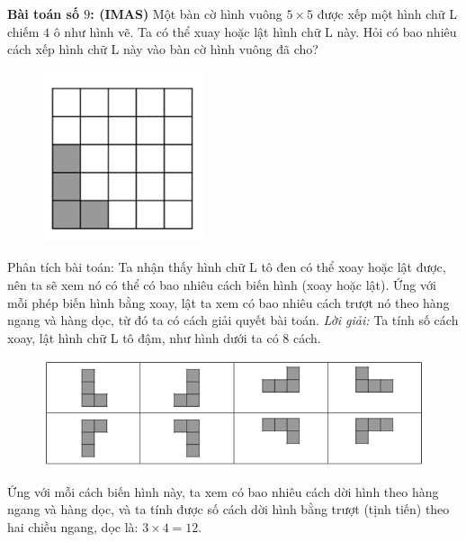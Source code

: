 \begin{multicols}{2}
	\vskip 0.1cm
	\textbf{\color{toancuabi}Bài toán số $9$: (IMAS)}
	\vskip 0.1cm
		Một bàn cờ hình vuông $5\times 5$ được xếp một hình chữ L chiếm $4$ ô như hình vẽ. Ta có thể xuay hoặc lật hình chữ L này. Hỏi có bao nhiêu cách xếp hình chữ L này vào bàn cờ hình vuông đã cho?
		\begin{figure}[H]
			\centering
			\vspace*{-10pt}
			\captionsetup{labelformat=empty, justification=centering}
			\includegraphics[width=0.4\linewidth]{_13}
			\vspace*{-15pt}
		\end{figure}
	Phân tích bài toán: Ta nhận thấy hình chữ L tô đen có thể xoay hoặc lật được, nên ta sẽ xem nó có thể có bao nhiêu cách biến hình (xoay hoặc lật).  Ứng với mỗi phép biến hình bằng xoay, lật ta xem có bao nhiêu cách trượt nó theo hàng ngang và hàng dọc, từ đó ta có cách giải quyết bài toán.
	\vskip 0.1cm
	\textit{Lời giải:}
	\vskip 0.1cm
	Ta tính số cách xoay, lật hình chữ L tô đậm, như hình dưới ta có $8$ cách.
	\begin{figure}[H]
		\centering
		\vspace*{-10pt}
		\captionsetup{labelformat=empty, justification=centering}
		\includegraphics[width=1\linewidth]{_14}
		\vspace*{-15pt}
	\end{figure}
	Ứng với mỗi cách biến hình này, ta xem có bao nhiêu cách dời hình theo hàng ngang và hàng dọc, và ta tính được số cách dời hình bằng trượt (tịnh tiến) theo hai chiều ngang, dọc là: $3\times4=12$.
	\vskip 0.1cm
		\begin{figure}[H]

\end{figure}
\end{multicols}
